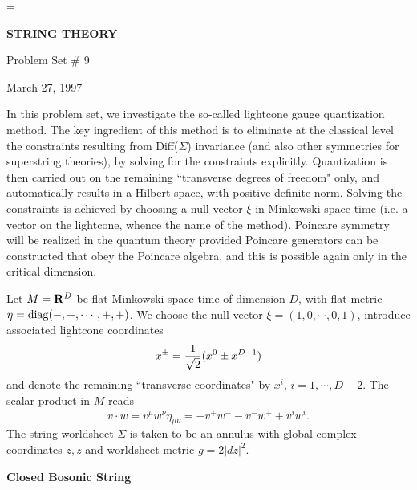 


\magnification=
\overfullrule=0pt
\baselineskip=17pt
\def\det{{\rm det}}
\def\Det{{\rm Det}}
\def\tr{{\rm tr}}
\def\Tr{{\rm Tr}}
\def\12{{1 \over 2}}
\def\ker{{\rm Ker}}
\def\O{{\cal O}}
\def\G{{\cal G}}

\centerline{{\bf STRING THEORY}}
\centerline{ Problem Set \# 9}
\centerline{March 27, 1997}

\bigskip
\bigskip

In this problem set, we investigate the so-called lightcone gauge
quantization method. The key ingredient of this method is to eliminate 
at the classical level the constraints resulting from Diff($\Sigma$)
invariance (and also other symmetries for superstring theories),
by solving for the constraints explicitly. Quantization is then 
carried out on the remaining ``transverse degrees of freedom" only,
and automatically results in a Hilbert space, with positive definite norm.
Solving the constraints is achieved by choosing a null vector $\xi$ in
Minkowski space-time (i.e. a vector on the lightcone, whence the 
name of the method). Poincare symmetry will be realized in the
quantum theory provided Poincare generators can be constructed 
that obey the Poincare algebra, and this is possible again only in 
the critical dimension.

Let $M={\bf R}^D$ be flat Minkowski space-time of dimension $D$, with 
flat metric $\eta= {\rm diag} (-,+,\cdots,+,+)$. We choose the null vector
$\xi = (1,0,\cdots,0,1)$, introduce associated lightcone coordinates
$$
x^\pm = {1 \over \sqrt 2} (x^0 \pm x^{D-1})
$$
and denote the remaining ``transverse coordinates" by $x^i$, $i=1,\cdots, 
D-2$.  The scalar product in $M$ reads
$$
v\cdot w = v^\mu w^\nu \eta _{\mu \nu} = -v^+ w^- - v^- w^+ + v^i w^i.
$$
The string worldsheet $\Sigma$ is taken to be an annulus with global 
complex coordinates $z, \bar z$ and worldsheet metric $g=2|dz|^2$.

\bigskip

\noindent
{\bf Closed Bosonic String} 

\medskip

